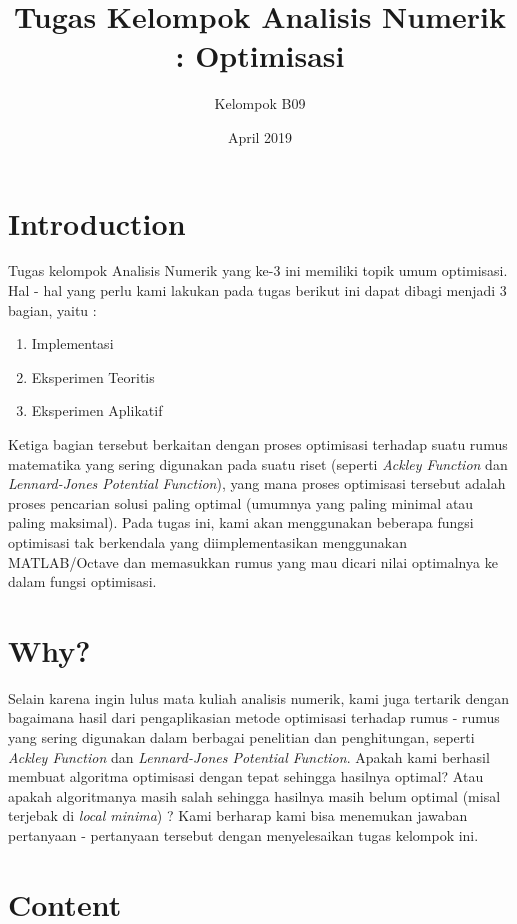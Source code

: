 \documentclass[11pt]{article}
\begin{document}
\title{Tugas Kelompok Analisis Numerik : Optimisasi}
\author{Kelompok B09}
\date{April 2019}
\maketitle

\section{Introduction}
\label{sec:Intro}
Tugas kelompok Analisis Numerik yang ke-3 ini memiliki topik umum optimisasi. Hal - hal yang perlu kami lakukan pada tugas berikut ini dapat dibagi menjadi 3 bagian, yaitu : 
\begin{enumerate}
    \item Implementasi
    \item Eksperimen Teoritis
    \item Eksperimen Aplikatif
\end{enumerate}

Ketiga bagian tersebut berkaitan dengan proses optimisasi terhadap suatu rumus matematika yang sering digunakan pada suatu riset (seperti \textit{Ackley Function} dan \textit{Lennard-Jones Potential Function}), yang mana proses optimisasi tersebut adalah proses pencarian solusi paling optimal (umumnya yang paling minimal atau paling maksimal). Pada tugas ini, kami akan menggunakan beberapa fungsi optimisasi tak berkendala yang diimplementasikan menggunakan MATLAB/Octave dan memasukkan rumus yang mau dicari nilai optimalnya ke dalam fungsi optimisasi.

\section{Why?}
Selain karena ingin lulus mata kuliah analisis numerik, kami juga tertarik dengan bagaimana hasil dari pengaplikasian metode optimisasi terhadap rumus - rumus yang sering digunakan dalam berbagai penelitian dan penghitungan, seperti \textit{Ackley Function} dan \textit{Lennard-Jones Potential Function}. Apakah kami berhasil membuat algoritma optimisasi dengan tepat sehingga hasilnya optimal? Atau apakah algoritmanya masih salah sehingga hasilnya masih belum optimal (misal terjebak di \textit{local minima}) ? Kami berharap kami bisa menemukan jawaban pertanyaan - pertanyaan tersebut dengan menyelesaikan tugas kelompok ini.

\section{Content}
\end{document}

